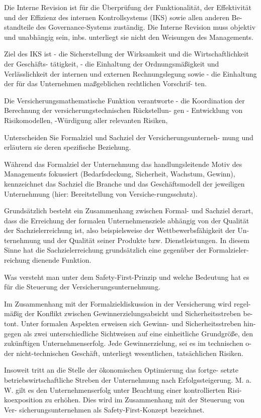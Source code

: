 Die Interne Revision ist für die Überprüfung der Funktionalität, der Effektivität
und der Effizienz des internen Kontrollsystems (IKS) sowie allen anderen Be-
standteile des Governance-Systems zuständig. Die Interne Revision muss objektiv
und unabhängig sein, inbs. unterliegt sie nicht den Weisungen des Managements.

Ziel des IKS ist
- die Sicherstellung der Wirksamkeit und die Wirtschaftlichkeit der Geschäfts-
tätigkeit,
- die Einhaltung der Ordnungsmäßigkeit und Verlässlichkeit der internen und
externen Rechnungslegung sowie
- die Einhaltung der für das Unternehmen maßgeblichen rechtlichen Vorschrif-
ten.

Die Versicherungsmathematische Funktion verantworte
- die Koordination der Berechnung der versicherungstechnischen Rückstellun-
gen 
- Entwicklung von Risikomodellen,
-Würdigung aller relevanten Risiken,


Unterscheiden Sie Formalziel und Sachziel der Versicherungsunterneh-
mung und erläutern sie deren spezifische Beziehung.

Während das Formalziel der Unternehmung das handlungsleitende Motiv des Managements fokussiert 
(Bedarfsdeckung, Sicherheit, Wachstum, Gewinn), kennzeichnet das Sachziel die Branche und das 
Geschäftsmodell der jeweiligen Unternehmung (hier: Bereitstellung von Versiche-rungsschutz).

Grundsätzlich besteht ein Zusammenhang zwischen Formal- und Sachziel derart,
dass die Erreichung der formalen Unternehmensziele abhängig von der Qualität
der Sachzielerreichung ist, also beispielsweise der Wettbewerbsfähigkeit der Un-
ternehmung und der Qualität seiner Produkte bzw. Dienstleistungen. In diesem
Sinne hat die Sachzielerreichung grundsätzlich eine gegenüber der Formalzieler-
reichung dienende Funktion.


Was versteht man unter dem Safety-First-Prinzip und welche Bedeutung
hat es für die Steuerung der Versicherungsunternehmung.

Im Zusammenhang mit der Formalzieldiskussion in der Versicherung wird regel-
mäßig der Konflikt zwischen Gewinnerzielungsabsicht und Sicherheitsstreben be-
tont. Unter formalen Aspekten erweisen sich Gewinn- und Sicherheitsstreben hin-
gegen als zwei unterschiedliche Sichtweisen auf eine einheitliche Grundgröße, den
zukünftigen Unternehmenserfolg. Jede Gewinnerzielung, sei es im technischen o-
der nicht-technischen Geschäft, unterliegt wesentlichen, tatsächlichen Risiken.

Insoweit tritt an die Stelle der ökonomischen Optimierung das fortge-
setzte betriebswirtschaftliche Streben der Unternehmung nach Erfolgssteigerung.
M. a. W. gilt es den Unternehmenserfolg unter Beachtung einer kontrollierten Risi-
koexposition zu erhöhen. Dies wird im Zusammenhang mit der Steuerung von Ver-
sicherungsunternehmen als Safety-First-Konzept bezeichnet.

